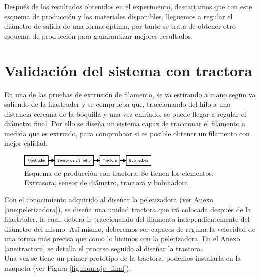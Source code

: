 Después de los resultados obtenidos en el experimento, descartamos que con este esquema de producción y los materiales disponibles, lleguemos a regular el diámetro de salida de una forma óptima, por tanto se trata de obtener otro esquema de producción para ganarantizar mejores resultados.

\section{Validación del sistema con tractora}
\label{sec:FST}

En una de las pruebas de extrusión de filamento, se va estirando a mano según va saliendo de la filastruder y se comprueba que, traccionando del hilo a una distancia cercana de la boquilla y una vez enfriado, se puede llegar a regular el diámetro final. Por ello se diseña un sistema capaz de traccionar el filamento a medida que es extruido, para comproboar si es posible obtener un filamento con mejor calidad.

\begin{figure}[H]
    \centering
    \includegraphics[width=0.6\textwidth]{images/producciones/Diagram2.png}
    \caption[Esquema de producción con tractora.]{Esquema de producción con tractora. Se tienen los elementos: Extrusora, sensor de diámetro, tractora y bobinadora.}
    \label{fig:esquemap_FST}
\end{figure}

Con el conocimiento adquirido al diseñar la peletizadora (ver Anexo \ref{ane:peletizadora}), se diseña una unidad tractora que irá colocada después de la filastruder, la cual, deberá ir traccionando del filamento independientemente del diámetro del mismo. Así mismo, deberemos ser capaces de regular la velocidad de una forma más precisa que como lo hicimos con la peletizadora. En el Anexo \ref{ane:tractora} se detalla el proceso seguido al diseñar la tractora.\\

Una vez se tiene un primer prototipo de la tractora, podemos instalarla en la maqueta (ver Figura \ref{fig:montaje_final}).

